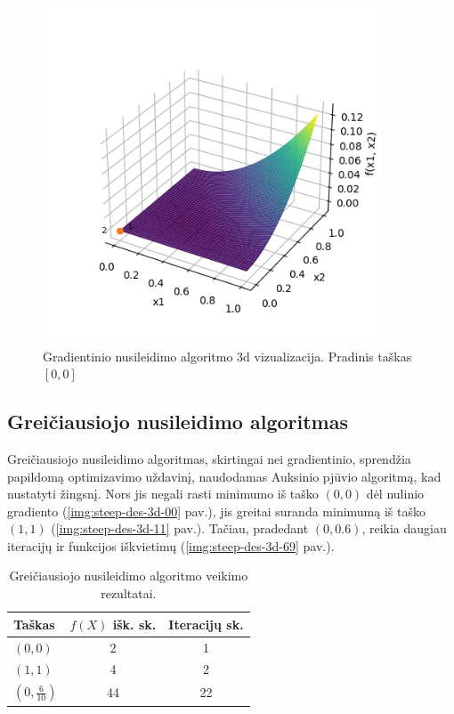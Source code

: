 \documentclass{VUMIFPSkursinis}
\begin{document}
\begin{figure}[H]
  \centering
  \includegraphics[width=10cm]{img/gradient_descent_3d_[0.0,0.0].png}
  \caption{Gradientinio nusileidimo algoritmo 3d vizualizacija. Pradinis taškas $[0, 0]$}
  \label{img:grad-des-3d-00}
\end{figure}

\pagebreak
\subsection{Greičiausiojo nusileidimo algoritmas}

Greičiausiojo nusileidimo algoritmas, skirtingai nei gradientinio, sprendžia papildomą optimizavimo uždavinį, naudodamas Auksinio pjūvio algoritmą, kad nustatyti žingsnį. Nors jis negali rasti minimumo iš taško $(0, 0)$ dėl nulinio gradiento (\ref{img:steep-des-3d-00} pav.), jis greitai suranda minimumą iš taško $(1, 1)$ (\ref{img:steep-des-3d-11}  pav.). Tačiau, pradedant $(0, 0.6)$, reikia daugiau iteracijų ir funkcijos iškvietimų (\ref{img:steep-des-3d-69} pav.).

\begin{table}[H]
  \centering
  \caption{Greičiausiojo nusileidimo algoritmo veikimo rezultatai.}
  \begin{tabular}{l c c}
    \hline\hline
    Taškas                         & $f(X)$ išk. sk. & Iteracijų sk. \\ [0.5ex]
    \hline
    $(0, 0)$                       & 2               & 1             \\
    $(1, 1)$                       & 4               & 2             \\
    $({0}, \frac{6}{10})$ & 44              & 22            \\ [1ex]
    \hline
  \end{tabular}
  \label{table:steep-des}
\end{table}
\end{document}
